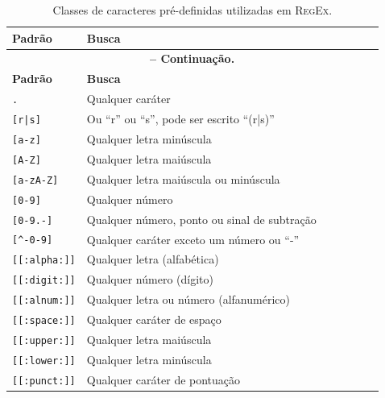 \begin{refsection}
\pagestyle{fancy}
\begin{center}

\begin{longtable}{lllllll}
\caption[Tabela \ref{tut2:table:classes}:Classes de caracteres pré-definidas utilizadas em \textsc{RegEx}]{Classes de caracteres pré-definidas utilizadas em \textsc{RegEx}.} \label{tut2:table:classes} \\


\hline\hline \textbf{Padrão} & \textbf{Busca}\\
\endfirsthead

\multicolumn{6}{c}{{\bfseries \tablename\ \thetable{} -- Continuação.}}\\
\hline\hline \textbf{Padrão} & \textbf{Busca}\\
\endhead
\hline \hline
\endlastfoot
\texttt{.} & Qualquer caráter\\
\texttt{[r|s]} & Ou ``r'' ou ``s'', pode ser escrito ``(r|s)''\\
\texttt{[a-z]} & Qualquer letra minúscula\\
\texttt{[A-Z]} & Qualquer letra maiúscula\\
\texttt{[a-zA-Z]} & Qualquer letra maiúscula ou minúscula\\
\texttt{[0-9]}  &  Qualquer número\\
\texttt{[0-9.-]} & Qualquer número, ponto ou sinal de subtração\\
\texttt{[\^{}-0-9]} & Qualquer caráter exceto um número ou ``-''\\
\texttt{[[:alpha:]]} & Qualquer letra (alfabética)\\
\texttt{[[:digit:]]} & Qualquer número (dígito)\\
\texttt{[[:alnum:]]} & Qualquer letra ou número (alfanumérico)\\
\texttt{[[:space:]]} & Qualquer caráter de espaço\\
\texttt{[[:upper:]]} & Qualquer letra maiúscula\\
\texttt{[[:lower:]]} & Qualquer letra minúscula\\
\texttt{[[:punct:]]} & Qualquer caráter de pontuação\\


\end{longtable}
\end{center}
\end{refsection}
